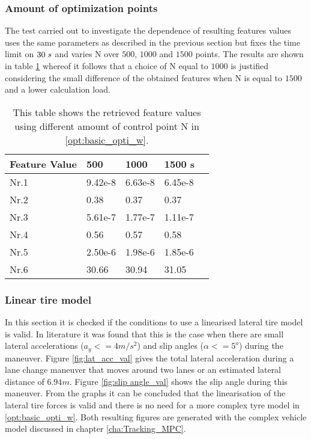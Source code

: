 \subsubsection{Amount of optimization points}
The test carried out to investigate the dependence of resulting features values uses the same parameters as described in the previous section but fixes the time limit on $30\hspace{1mm}s$ and varies N over $500$, $1000$ and $1500$ points. The results are shown in table \ref{tab:GD_N} whereof it follows that a choice of N equal to $1000$ is justified considering the small difference of the obtained features when N is equal to $1500$ and a lower calculation load.

\begin{table}[h!]
	\centering
	\begin{tabular}{@{}llllr@{}} \toprule
		\textbf{Feature Value}    & 500  & 1000      & 1500 s\\ \midrule
		Nr.1       & 9.42e-8     & 6.63e-8   & 6.45e-8\\
		Nr.2       & 0.38        & 0.37      & 0.37\\
		Nr.3       & 5.61e-7     & 1.77e-7   & 1.11e-7 \\
		Nr.4       & 0.56        & 0.57      & 0.58\\
		Nr.5       & 2.50e-6     & 1.98e-6   & 1.85e-6\\
		Nr.6       & 30.66       & 30.94     & 31.05\\ \bottomrule
	\end{tabular}
	\caption{This table shows the retrieved feature values using different amount of control point N in \ref{opt:basic_opti_w}.}
	\label{tab:GD_N}
\end{table}


\subsubsection{Linear tire model}
In this section it is checked if the conditions to use a linearised lateral tire model is valid. In literature \cite{TongDuySon2019} it was found that this is the case when there are small lateral accelerations ($a_y <= 4 m/s^2$) and slip angles ($\alpha <= 5^o$) during the maneuver. Figure \ref{fig:lat_acc_val} gives the total lateral acceleration during a lane change maneuver that moves around two lanes or an estimated lateral distance of $6.94 m$. Figure \ref{fig:slip angle_val} shows the slip angle during this maneuver. From the graphs it can be concluded that the linearisation of the lateral tire forces is valid and there is no need for a more complex tyre model in \ref{opt:basic_opti_w}.  Both resulting figures are generated with the complex vehicle model discussed in chapter \ref{cha:Tracking_MPC}.


